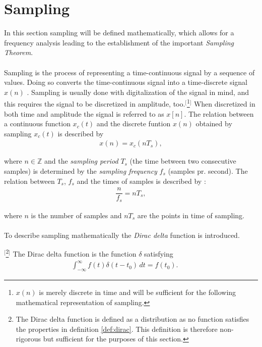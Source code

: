 \section{Sampling} \label{sec:sampling}
In this section sampling will be defined mathematically, which allows for a frequency analysis leading to the establishment of the important \textit{Sampling Theorem}.
\\ \\
Sampling is the process of representing a time-continuous signal by a sequence of values. Doing so converts the time-continuous signal into a time-discrete signal $x(n)$ \cite{pelgrom}. Sampling is usually done with digitalization of the signal in mind, and this requires the signal to be discretized in amplitude, too.$^[$\footnote{$x(n)$ is merely discrete in time and will be sufficient for the following mathematical representation of sampling.}$^]$ When discretized in both time and amplitude the signal is referred to as $x[n]$. The relation between a continuous function $x_c(t)$ and the discrete funtion $x(n)$ obtained by sampling $x_c(t)$ is described by
\begin{align} \label{eq:sampling_principle}
x(n)=x_c(nT_s),
\end{align}

where $n \in \mathbb{Z}$ and the \textit{sampling period} $T_s$ (the time between two consecutive samples) is determined by the \textit{sampling frequency} $f_s$ (samples pr. second). The relation between $T_s$, $f_s$ and the times of samples is described by \cite{pelgrom}:
\begin{align} \label{eq:sample_freq}
\dfrac{n}{f_s} = nT_s,
\end{align}

where $n$ is the number of samples and $nT_s$ are the points in time of sampling.
\\ \\
To describe sampling mathematically the \textit{Dirac delta} function is introduced.

\begin{definition}$^[$\footnote{The Dirac delta function is defined as a distribution as no function satisfies the properties in definition \ref{def:dirac}. This definition is therefore non-rigorous but sufficient for the purposes of this section.}$^]$ \label{def:dirac}
The Dirac delta function is the function $\delta$ satisfying
\begin{align}
\int_{-\infty}^{\infty} \! f(t)\delta(t-t_0) \, dt=f(t_0).\phantom{mm}
\end{align}
\end{definition}

